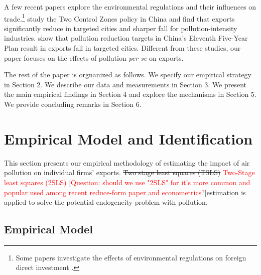 \documentclass[12pt]{article}
\begin{document}
A few recent papers explore the environmental regulations and their
influences on trade.\footnote{%
Some papers investigate the effects of environmental regulations on foreign
direct investment \citep{dean2009foreign,cai2016does}.} \cite{%
hering2014environmental} study the Two Control Zones policy in China and
find that exports significantly reduce in targeted cities and sharper fall
for pollution-intensity industries. \cite{shi2018environmental} show that
pollution reduction targets in China's Eleventh Five-Year Plan result in
exports fall in targeted cities. Different from these studies, our paper
focuses on the effects of pollution \textit{per se} on exports.

The rest of the paper is orgnanized as follows. We specify our empirical
strategy in Section 2. We describe our data and
measurements in Section 3. We present the main empirical findings in Section
4 and explore the mechanisms in Section 5. We provide concluding remarks in
Section 6.

\section{Empirical Model and Identification}

\label{sec:empirical_strategy} This section presents our empirical
methodology of estimating the impact of air pollution on individual firms'
exports. \sout{Two stage least squares (TSLS)} \textcolor{red}{Two-Stage least squares (2SLS)} [\textcolor{red}{Question: should we use "2SLS" for it's more common and popular used among recent reduce-form paper and econometrics?}]estimation is applied to solve the
potential endogeneity problem with pollution.

\subsection{Empirical Model}
\end{document}
